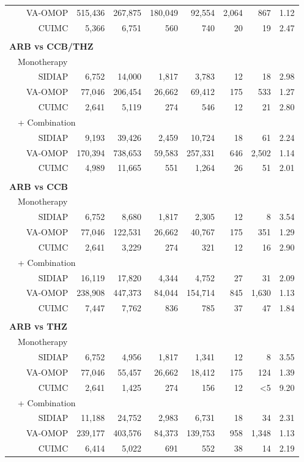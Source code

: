 \documentclass[11pt,]{article}
\begin{document}
\begin{longtable}{p{-2em}p{-2em}rrrrrrrr}
   &  & VA-OMOP & 515,436 & 267,875 & 180,049 & 92,554 & 2,064 & 867 & 1.12 \\ 
   &  & CUIMC & 5,366 & 6,751 & 560 & 740 & 20 & 19 & 2.47 \\ 
   \rowcolor{white} \\ \multicolumn{9}{l}{\textbf{ARB vs CCB/THZ}} \\ & \multicolumn{9}{l}{Monotherapy}  \\ &  & SIDIAP & 6,752 & 14,000 & 1,817 & 3,783 & 12 & 18 & 2.98 \\ 
   &  & VA-OMOP & 77,046 & 206,454 & 26,662 & 69,412 & 175 & 533 & 1.27 \\ 
   &  & CUIMC & 2,641 & 5,119 & 274 & 546 & 12 & 21 & 2.80 \\ 
                           & \multicolumn{8}{l}{+ Combination} \\ &  & SIDIAP & 9,193 & 39,426 & 2,459 & 10,724 & 18 & 61 & 2.24 \\ 
   &  & VA-OMOP & 170,394 & 738,653 & 59,583 & 257,331 & 646 & 2,502 & 1.14 \\ 
   &  & CUIMC & 4,989 & 11,665 & 551 & 1,264 & 26 & 51 & 2.01 \\ 
   \rowcolor{white} \\ \multicolumn{9}{l}{\textbf{ARB vs CCB}} \\ & \multicolumn{9}{l}{Monotherapy}  \\ &  & SIDIAP & 6,752 & 8,680 & 1,817 & 2,305 & 12 & 8 & 3.54 \\ 
   &  & VA-OMOP & 77,046 & 122,531 & 26,662 & 40,767 & 175 & 351 & 1.29 \\ 
   &  & CUIMC & 2,641 & 3,229 & 274 & 321 & 12 & 16 & 2.90 \\ 
                           & \multicolumn{8}{l}{+ Combination} \\ &  & SIDIAP & 16,119 & 17,820 & 4,344 & 4,752 & 27 & 31 & 2.09 \\ 
   &  & VA-OMOP & 238,908 & 447,373 & 84,044 & 154,714 & 845 & 1,630 & 1.13 \\ 
   &  & CUIMC & 7,447 & 7,762 & 836 & 785 & 37 & 47 & 1.84 \\ 
   \rowcolor{white} \\ \multicolumn{9}{l}{\textbf{ARB vs THZ}} \\ & \multicolumn{9}{l}{Monotherapy}  \\ &  & SIDIAP & 6,752 & 4,956 & 1,817 & 1,341 & 12 & 8 & 3.55 \\ 
   &  & VA-OMOP & 77,046 & 55,457 & 26,662 & 18,412 & 175 & 124 & 1.39 \\ 
   &  & CUIMC & 2,641 & 1,425 & 274 & 156 & 12 & <5 & 9.20 \\ 
                           & \multicolumn{8}{l}{+ Combination} \\ &  & SIDIAP & 11,188 & 24,752 & 2,983 & 6,731 & 18 & 34 & 2.31 \\ 
   &  & VA-OMOP & 239,177 & 403,576 & 84,373 & 139,753 & 958 & 1,348 & 1.13 \\ 
   &  & CUIMC & 6,414 & 5,022 & 691 & 552 & 38 & 14 & 2.19 \\ 
  
  \bottomrule
\end{longtable}
\end{document}
